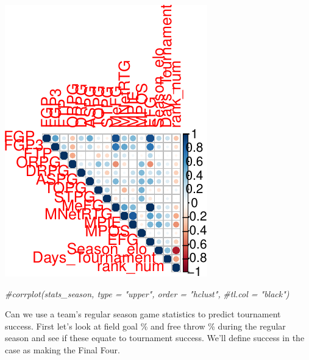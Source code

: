 \documentclass[]{article}
\newenvironment{Shaded}{\begin{snugshade}}{\end{snugshade}}
\newcommand{\CommentTok}[1]{\textcolor[rgb]{0.56,0.35,0.01}{\textit{#1}}}
\begin{document}
\includegraphics{EDA_files/figure-latex/unnamed-chunk-12-4.pdf}

\begin{Shaded}
\begin{Highlighting}[]
\CommentTok{#corrplot(stats_season, type = "upper", order = "hclust", }
         \CommentTok{#tl.col = "black")}
\end{Highlighting}
\end{Shaded}

Can we use a team's regular season game statistics to predict tournament
success. First let's look at field goal \% and free throw \% during the
regular season and see if these equate to tournament success. We'll
define success in the case as making the Final Four.
\end{document}
